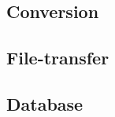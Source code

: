 \subsection{Conversion}

\FloatBarrier


\subsection{File-transfer}

\FloatBarrier

\subsection{Database}

\FloatBarrier
